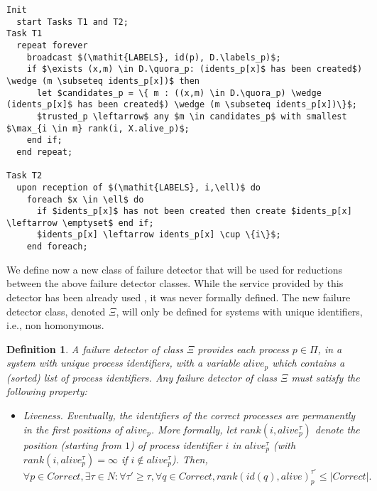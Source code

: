 \documentclass[10pt, conference, compsocconf]{IEEEtran}
\newtheorem{definition}{Definition}
\newcommand{\HS}{{H\Sigma}}
\newcommand{\C}{{\mathit{Correct}}}
\newcommand{\quora}{{\mathit{h\_quora}}}
\newcommand{\labels}{{\mathit{h\_labels}}}
\begin{document}
\begin{figure*}
\begin{lstlisting}
Init
  start Tasks T1 and T2;
Task T1
  repeat forever
    broadcast $(\mathit{LABELS}, id(p), D.\labels_p)$;
    if $\exists (x,m) \in D.\quora_p: (idents_p[x]$ has been created$) \wedge (m \subseteq idents_p[x])$ then
      let $candidates_p = \{ m : ((x,m) \in D.\quora_p) \wedge (idents_p[x]$ has been created$) \wedge (m \subseteq idents_p[x])\}$;
      $trusted_p \leftarrow$ any $m \in candidates_p$ with smallest $\max_{i \in m} rank(i, X.alive_p)$;
    end if;
  end repeat;

Task T2	
  upon reception of $(\mathit{LABELS}, i,\ell)$ do
    foreach $x \in \ell$ do 
      if $idents_p[x]$ has not been created then create $idents_p[x] \leftarrow \emptyset$ end if;
      $idents_p[x] \leftarrow idents_p[x] \cup \{i\}$;
    end foreach;
\end{lstlisting}		
\caption{Algorithm to transform $D \in \HS$ to $\Sigma$ in a system with unique identifiers, but without initial knowledge of membership (code for process $p$). The algorithm uses a failure detector $X$ of class $\Xi$.}
\label{Fig-HS-to-S-no-mship}
\end{figure*}


We define now a new class of failure detector that will be used for reductions between the above failure detector classes.
While the service provided by this detector has been already used \cite{DBLP:conf/podc/Zielinski08,DBLP:conf/wdag/BonnetR10}, it was never formally
defined. The new failure detector class, denoted $\Xi$, will only be defined for systems with unique identifiers, i.e., non homonymous.

\begin{definition}
A failure detector of class $\Xi$ provides each process  $p \in \Pi$, in a system with unique process identifiers, with a variable $alive_p$ which contains a (sorted) list of process identifiers. 
Any failure detector of class $\Xi$ must satisfy the following property:
\begin{itemize}
\item Liveness.
 Eventually, the identifiers of the correct processes 
are permanently in the first positions of $alive_p$. More formally,
 let $rank(i, alive_p^{\tau})$ denote the position (starting from $1$) of process identifier $i$ in $alive_p^{\tau}$ 
 (with $rank(i, alive_p^{\tau})=\infty$ if $i \notin alive_p^{\tau}$). Then,
 $\forall p \in \C , \exists \tau \in N: \forall \tau' \ge \tau, \forall q \in \C, rank(id(q), alive)_p^{\tau'} \leq |\C|.$
 \end{itemize}
\end{definition}
\end{document}

